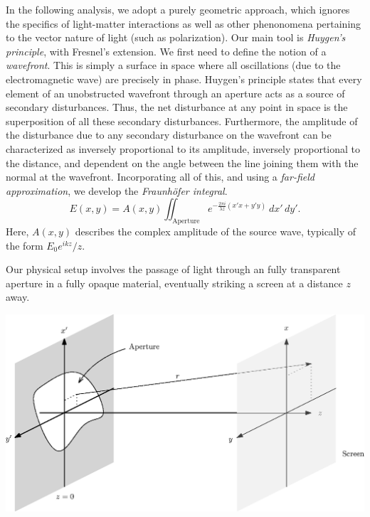 \documentclass[11pt]{article}
\begin{document}
        In the following analysis, we adopt a purely geometric approach, which ignores the specifics of light-matter interactions
        as well as other phenonomena pertaining to the vector nature of light (such as polarization). Our main tool is 
        \textit{Huygen's principle}, with Fresnel's extension. We first need to define the notion of a \textit{wavefront}.
        This is simply a surface in space where all oscillations (due to the electromagnetic wave) are precisely in phase.
        Huygen's principle states that every element of an unobstructed wavefront through an aperture acts as a source of
        secondary disturbances. Thus, the net disturbance at any point in space is the superposition of all these secondary disturbances.
        Furthermore, the amplitude of the disturbance due to any secondary disturbance on the wavefront can be characterized as inversely proportional
        to its amplitude, inversely proportional to the distance, and dependent on the angle between the line joining them with the normal at
        the wavefront. Incorporating all of this, and using a \textit{far-field approximation}, we develop the \textit{Fraunh\"ofer integral}.
        \[
                E(x, y) = A(x, y) \iint_{\text{Aperture}} e^{-\frac{2\pi i}{\lambda z} (x'x + y'y)}\:dx'\,dy'.
        \]
        Here, $A(x, y)$ describes the complex amplitude of the source wave, typically of the form $E_0 e^{ikz} / z$.
        
        Our physical setup involves the passage of light through an fully transparent aperture in a fully opaque material, eventually
        striking a screen at a distance $z$ away.
        \begin{center}
                \includegraphics[scale=0.7]{fraunhofer.eps}
        \end{center}
\end{document}
